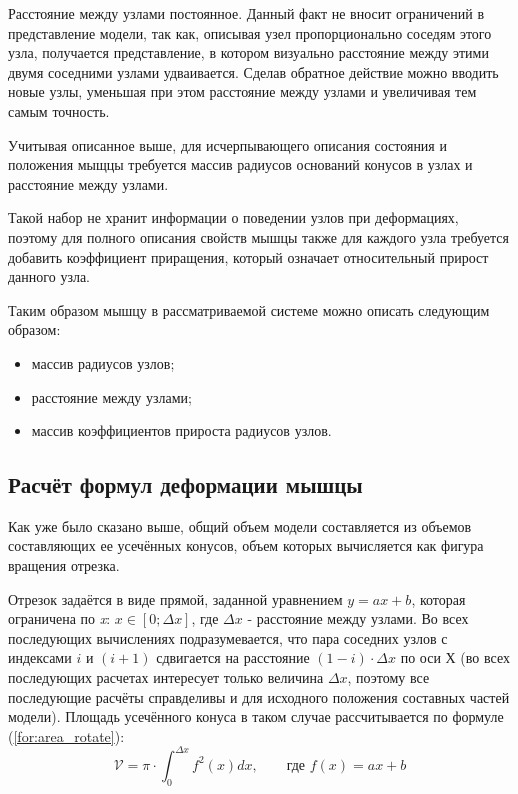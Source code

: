 Расстояние между узлами постоянное. Данный факт не вносит ограничений в представление модели, так как, описывая узел пропорционально соседям этого узла, получается представление, в котором визуально расстояние между этими двумя соседними узлами удваивается. Сделав обратное действие можно вводить новые узлы, уменьшая при этом расстояние между узлами и увеличивая тем самым точность.

Учитывая описанное выше, для исчерпывающего описания состояния и положения мыщцы требуется массив радиусов оснований конусов в узлах и расстояние между узлами.

Такой набор не хранит информации о поведении узлов при деформациях, поэтому для полного описания свойств мышцы также для каждого узла требуется добавить коэффициент приращения, который означает относительный прирост данного узла.

Таким образом мышцу в рассматриваемой системе можно описать следующим образом:
\begin{itemize}
    \item массив радиусов узлов;
    \item расстояние между узлами;
    \item массив коэффициентов прироста радиусов узлов.
\end{itemize}

\subsection{Расчёт формул деформации мышцы}

Как уже было сказано выше, общий объем модели составляется из объемов составляющих ее усечённых конусов, объем которых вычисляется как фигура вращения отрезка. 

Отрезок задаётся в виде прямой, заданной уравнением $ y = ax + b $, которая ограничена по \textit{x}: $x \in [0; \Delta x]$, где $\Delta x$ - расстояние между узлами. Во всех последующих вычислениях подразумевается, что пара соседних узлов с индексами $i$ и $(i + 1)$ сдвигается на расстояние $(1 - i) \cdot \Delta x$ по оси Х (во всех последующих расчетах интересует только величина $\Delta x$, поэтому все последующие расчёты справделивы и для исходного положения составных частей модели). Площадь усечённого конуса в таком случае рассчитывается по формуле (\ref{for:area_rotate}):
\begin{equation}
    \label{for:area_rotate}
    \mathcal{V} = \pi \cdot \int_{0}^{\Delta x}f^2(x)dx,\qquad \text{где }f(x) = ax + b
\end{equation}

